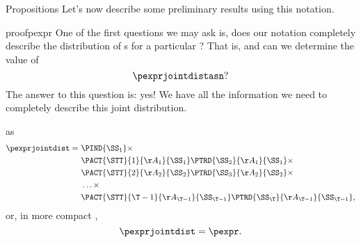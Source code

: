 \begin{part}{Propositions}
  \nrp
  Let's now describe some preliminary results using this notation.

  \begin{refenv}{proof}{pexpr}
    \nrp
    One of the first questions we may ask is, does our notation completely describe
    the distribution of \run{}s for a particular \str?
    That is, 
    and
    can we determine the value of
    $$\pexprjointdistasn?$$
    The answer to this question is: yes! 
    We have all the information we need 
    to completely describe 
    this joint distribution. 

    \nrp
     as
    \begin{align*}
      \pexprjointdist
      =\ &\PIND{\SS_1}\times\\
         &\PACT{\STT}{1}{\AA_1}{\SS_1}
          \PTRD{\SS_2}{\AA_1}{\SS_1}\times\\
         &\PACT{\STT}{2}{\AA_2}{\SS_2}
          \PTRD{\SS_3}{\AA_2}{\SS_2}\times\\
         &\ldots\times\\
         &\PACT{\STT}{{\T - 1}}{\AA_{\T - 1}}{\SS_{\T - 1}}
          \PTRD{\SS_\T}{\AA_{\T - 1}}{\SS_{\T - 1}},
    \end{align*}
    or, in more compact ,
    $$\pexprjointdist = \pexpr.$$
  \end{refenv}
\end{part}
